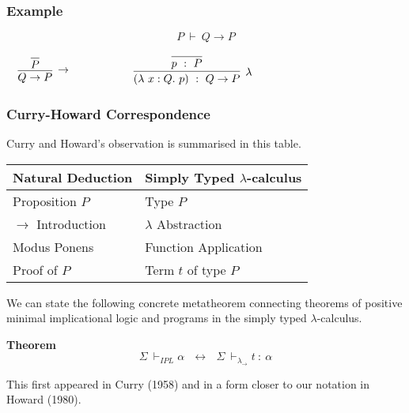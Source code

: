 \documentclass{beamer}
\theoremstyle{indentDefn} \newtheorem{defn}[]{Definition}
\begin{document}
\begin{frame}
  \frametitle{Example}

  $$P \ \vdash \ Q \to P$$

  \vspace{1cm}

  \begin{center}
    $\begin{array}{l c r}
      
      \begin{array}{c}
        \infer[\to]{Q \to P}
          {\infer[]{P}{}}
      \end{array}

      &
      \hspace{1cm}
      &
      
      \begin{array}{c}
        \infer[\lambda]{(\lambda \ x : Q. \ p) \ : \ Q \to P}
          {\infer[]{p \ : \ P}{}}
      \end{array}

    \end{array}$
  \end{center}

  \vspace{2.5cm}
\end{frame}

\begin{frame}
  \frametitle{Curry-Howard Correspondence}

  Curry and Howard's observation is summarised in this table.

  \begin{center}
    \begin{tabular}{l|l}
      Natural Deduction & Simply Typed $\lambda$-calculus \\
      \hline
      Proposition $P$ & Type $P$ \\
      $\to$ Introduction & $\lambda$ Abstraction\\
      Modus Ponens & Function Application \\
      Proof of $P$ & Term $t$ of type $P$
    \end{tabular}
  \end{center}

  We can state the following concrete metatheorem connecting theorems of positive minimal implicational logic and programs in the simply typed $\lambda$-calculus.

  {\bf Theorem}$$ \Sigma \ \vdash_{IPL} \alpha \ \ \ \leftrightarrow \ \ \ \Sigma \ \vdash_{\lambda_{\to}} t \ : \ \alpha$$

  This first appeared in Curry (1958) \cite{curryCombinatoryLogic} and in a form closer to our notation in Howard (1980).
\end{frame}
\end{document}
